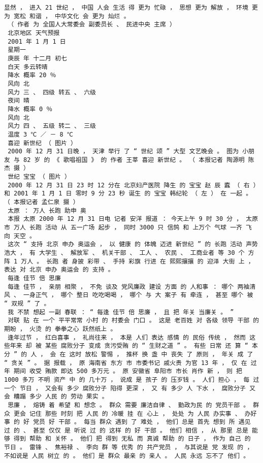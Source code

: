 \documentclass{article}
\begin{document}
\begin{Verbatim}[commandchars=\\\{\}]
 显然 ， 进入 21 世纪 ， 中国 人会 生活 得 更为 忙碌 ， 思想 更为 解放 ， 环境 更为 宽松 和谐 ， 中华文化 会 更为 灿烂 。 
 （ 作者 为 全国人大常委会 副委员长 、 民进中央 主席 ） 
 北京地区 天气预报 
 2001 年 1 月 1 日 
 星期一 
 庚辰 年 十二月 初七 
 白天 多云转晴 
 降水 概率 20 ％ 
 风向 北 
 风力 三 、 四级 转五 、 六级 
 夜间 晴 
 降水 概率 0 ％ 
 风向 北 
 风力 四 、 五级 转二 、 三级 
 温度 3 ℃ ／ － 8 ℃ 
 喜迎 新世纪 （ 图片 ） 
 2000 年 12 月 31 日晚 ， 天津 举行 了 “ 世纪 颂 ” 大型 文艺晚会 。 图为 小朋友 与 82 岁 的 《 歌唱祖国 》 的 作者 王莘 喜迎 新世纪 。 （ 本报记者 陶源明 陈杰 摄 ） 
 世纪 宝宝 （ 图片 ） 
 2000 年 12 月 31 日 23 时 12 分在 北京妇产医院 降生 的 宝宝 赵 辰 蠧 （ 右 ） 和 2001 年 1 月 1 日 零时 9 分 23 秒 诞生 的 宝宝 韩纪轮 （ 左 ） 在 一起 。 （ 本报记者 孟仁泉 摄 ） 
 太原 ： 万人 长跑 助申 奥 
 本报 太原 2000 年 12 月 31 日电 记者 安洋 报道 ： 今天上午 9 时 30 分 ， 太原市 万人 长跑 活动 从 五一广场 起步 ， 同时 3000 只 信鸽 和 上万个 气球 一齐 飞 向 天空 。 
 这次 “ 支持 北京 申办 奥运会 ， 以 健康 的 体魄 迈进 新世纪 ” 的 长跑 活动 声势浩大 ， 有 大学生 、 解放军 、 机关干部 、 工人 、 农民 、 工商业者 等 30 个 方阵 1 万人 。 长跑 者 身披 彩带 、 手持 彩旗 行进 在 熙熙攘攘 的 迎泽 大街 上 ， 表达 对 北京 申办 奥运会 的 支持 。 
 每逢 佳节 倍 思廉 
 每逢 佳节 ， 亲朋 相聚 ， 不免 谈及 党风廉政 建设 方面 的 人和事 ： 哪个 两袖清风 、 一身正气 ， 哪个 整日 吃吃喝喝 ， 哪个 与 大 案子 有 牵连 ， 甚至 哪个 被 “ 双规 ” 了 。 
 我 不禁 想起 一副 春联 ： “ 每逢 佳节 倍 思廉 ， 且 把 年关 当廉关 。 ” 
 对联 贴 在 一个 平平常常 小村 的 村委会 门口 。 这是 老百姓 对 各级 领导 干部 的 期盼 ， 火烫 的 拳拳之心 跃然纸上 。 
 逢年过节 ， 红白喜事 ， 礼尚往来 ， 本是 人们 表达 感情 的 民俗 传统 ， 然而 这些年来 却 被 某些 腐败分子 变成 贪污受贿 的 “ 生财之道 ” 。 有些 日常 还 算 “ 本分 ” 的 人 ， 会 在 这时 放松 警惕 ， 推杯 换 盏 中 丧失 了 原则 ， 年关 成 了 “ 贪关 ” 。 据 报载 ， 原 海南省 东方 市 市委书记 戚火贵 为官 13 年 ， 仅 在 过年 期间 收受 贿款 即达 500 多万元 。 原 安徽省 阜阳市 市长 肖作 新 ， 则 把 1000 多万 不明 资产 中 的 几十万 ， 说成 是 孩子 的 压岁钱 。 人们 担心 ， 每 过 一个 节日 ， 又会有 多少 腐败分子 陷得 更深 ， 又 有 多少 人 下水 ， 腐败分子 又 会 糟蹋 多少 人民 的 劳动 果实 。 
 思廉 ， 熔铸 着 希望 和 想念 。 群众 需要 廉洁自律 、 勤政为民 的 党员干部 。 群众 更会 记住 那些 时刻 把 人民 的 冷暖 挂 在 心上 ， 处处 为 人民 办实事 、 办好事 的 好 党员 好 干部 。 每当 群众 遇到 了 难处 ， 他们 总是 首先 想到 所 遇见 过 的 、 甚至 仅仅 是 听说 过 的 这样 的 好 干部 。 他们 相信 ， 从 那里 总是 能够 得到 帮助 和 关怀 。 他们 把 得到 无私 而 真诚 帮助 的 日子 ， 作为 自己 的 节日 。 雷锋 、 焦裕禄 、 李向 群 等 优秀 的 共产党员 ， 与其说是 党 发现 的 ， 不如说是 人民 树立 的 。 他们 是 群众 最亲 的 亲人 。 人民 永远 忘不了 他们 。 

\end{Verbatim}
\end{document}
